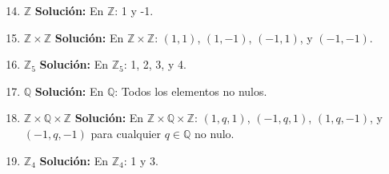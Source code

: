 \begin{enumerate}
	\setcounter{enumi}{13}
	\item $\mathbb{Z}$
	\textbf{Solución:} En \(\mathbb{Z}\): 1 y -1.
	\item \(\mathbb{Z} \times \mathbb{Z}\)
	\textbf{Solución:} En \(\mathbb{Z} \times \mathbb{Z}\): \((1, 1)\), \((1, -1)\), \((-1, 1)\), y \((-1, -1)\).
	\item \(\mathbb{Z}_5\)
	\textbf{Solución:} En  \(\mathbb{Z}_5\): 1, 2, 3, y 4.
	\item \(\mathbb{Q}\)
	\textbf{Solución:} En \(\mathbb{Q}\): Todos los elementos no nulos.
	\item \(\mathbb{Z} \times \mathbb{Q} \times \mathbb{Z}\)
	\textbf{Solución:} En \(\mathbb{Z} \times \mathbb{Q} \times \mathbb{Z}\): \((1, q, 1)\), \((-1, q, 1)\), \((1, q, -1)\), y \((-1, q, -1)\) para cualquier \(q \in \mathbb{Q}\) no nulo.
	\item \(\mathbb{Z}_4\)
	\textbf{Solución:} En \(\mathbb{Z}_4\): 1 y 3.
\end{enumerate}

